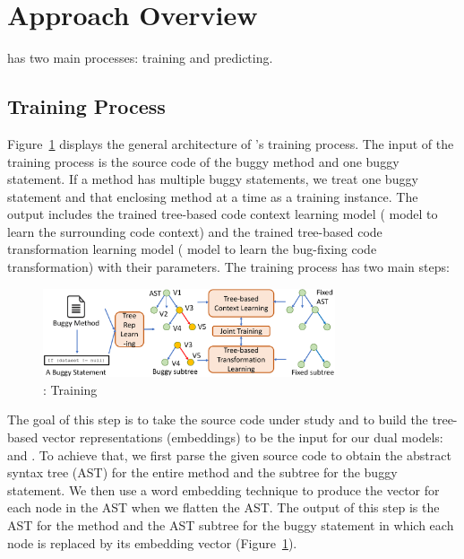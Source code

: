 \section{Approach Overview}
\label{overview:sec}

{\tool} has two main processes: training and predicting.

\subsection{Training Process}

Figure~\ref{overview-training} displays the general architecture of
{\tool}'s training process. The input of the training process is the
source code of the buggy method and one buggy statement. If a method
has multiple buggy statements, we treat one buggy statement and that
enclosing method at a time as a training instance. The output includes
the trained tree-based code context learning model ( model
to learn the surrounding code context) and the trained tree-based code
transformation learning model ( model to learn the
bug-fixing code transformation) with their parameters. The training
process has two main steps:

\begin{figure}[t]
	\centering
	\includegraphics[width=3.4in]{graphs/overview-training.png}
	\caption{{\tool}: Training}
	\label{overview-training}
\end{figure}

 The goal of this
step is to take the source code under study and to build the
tree-based vector representations (embeddings) to be the input for our
dual models:  and . To achieve that, we first
parse the given source code to obtain the abstract syntax tree (AST)
for the entire method and the subtree for the buggy statement.  We
then use a word embedding technique to produce the vector for each
node in the AST when we flatten the AST. The output of this step is
the AST for the method and the AST subtree for the buggy statement in
which each node is replaced by its embedding vector
(Figure~\ref{overview-training}).

